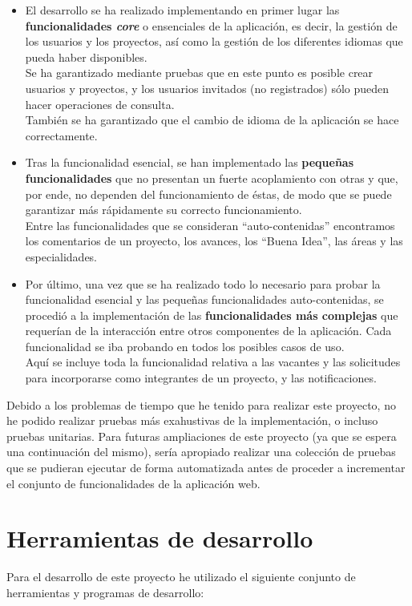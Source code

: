 \begin{itemize}
    \item El desarrollo se ha realizado implementando en primer lugar las \textbf{funcionalidades \textit{core}} o ensenciales de la aplicación, es decir, la gestión de los usuarios y los proyectos, así como la gestión de los diferentes idiomas que pueda haber disponibles.\\
    Se ha garantizado mediante pruebas que en este punto es posible crear usuarios y proyectos, y los usuarios invitados (no registrados) sólo pueden hacer operaciones de consulta.\\
    También se ha garantizado que el cambio de idioma de la aplicación se hace correctamente.
    \item Tras la funcionalidad esencial, se han implementado las \textbf{pequeñas funcionalidades} que no presentan un fuerte acoplamiento con otras y que, por ende, no dependen del funcionamiento de éstas, de modo que se puede garantizar más rápidamente su correcto funcionamiento.\\
    Entre las funcionalidades que se consideran ``auto-contenidas'' encontramos los comentarios de un proyecto, los avances, los ``Buena Idea'', las áreas y las especialidades.
    \item Por último, una vez que se ha realizado todo lo necesario para probar la funcionalidad esencial y las pequeñas funcionalidades auto-contenidas, se procedió a la implementación de las \textbf{funcionalidades más complejas} que requerían de la interacción entre otros componentes de la aplicación. Cada funcionalidad se iba probando en todos los posibles casos de uso.\\
    Aquí se incluye toda la funcionalidad relativa a las vacantes y las solicitudes para incorporarse como integrantes de un proyecto, y las notificaciones.
\end{itemize}

Debido a los problemas de tiempo que he tenido para realizar este proyecto, no he podido realizar pruebas más exahustivas de la implementación, o incluso pruebas unitarias. Para futuras ampliaciones de este proyecto (ya que se espera una continuación del mismo), sería apropiado realizar una colección de pruebas que se pudieran ejecutar de forma automatizada antes de proceder a incrementar el conjunto de funcionalidades de la aplicación web.

\section{Herramientas de desarrollo}
Para el desarrollo de este proyecto he utilizado el siguiente conjunto de herramientas y programas de desarrollo:


